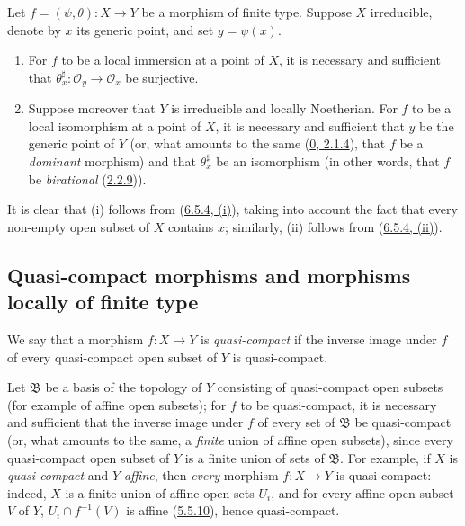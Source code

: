 \begin{corollary}[6.5.5]
\label{I.6.5.5}
Let $f=(\psi,\theta):X\to Y$ be a morphism of finite type. Suppose $X$
irreducible, denote by $x$ its generic point, and set $y=\psi(x)$.
\begin{enumerate}
  \item[(i)] For $f$ to be a local immersion at a point of $X$, it is
    necessary and sufficient that
    $\theta_x^\sharp:\mathscr{O}_y\to\mathscr{O}_x$ be surjective.
  \item[(ii)] Suppose moreover that $Y$ is irreducible and locally Noetherian.
    For $f$ to be a local isomorphism at a point of $X$, it is necessary and
    sufficient that $y$ be the generic point of $Y$ (or, what amounts to the
    same (\hyperref[0.2.1.4]{0, 2.1.4}), that $f$ be a
    \emph{dominant} morphism) and that $\theta_x^\sharp$ be an isomorphism (in
    other words, that $f$ be \emph{birational}
    (\hyperref[I.2.2.9]{2.2.9})).
\end{enumerate}
\end{corollary}

It is clear that (i) follows from
(\hyperref[I.6.5.4]{6.5.4, (i)}), taking into account the fact that every
non-empty open subset of $X$ contains $x$; similarly, (ii) follows from
(\hyperref[I.6.5.4]{6.5.4, (ii)}).

\subsection{Quasi-compact morphisms and morphisms locally of finite type}
\label{subsection:I.6.6}

\begin{definition}[6.6.1]
\label{I.6.6.1}
We say that a morphism $f:X\to Y$ is \emph{quasi-compact} if the inverse
image under $f$ of every quasi-compact open subset of $Y$ is quasi-compact.
\end{definition}

Let $\mathfrak{B}$ be a basis of the topology of $Y$ consisting of
quasi-compact open subsets (for example of affine open subsets); for $f$ to be
quasi-compact, it is necessary and sufficient that the inverse image under $f$
of every set of $\mathfrak{B}$ be quasi-compact (or, what amounts to the same,
a \emph{finite} union of affine open subsets), since every quasi-compact open
subset of $Y$ is a finite union of sets of $\mathfrak{B}$. For example, if $X$
is \emph{quasi-compact} and $Y$ \emph{affine}, then \emph{every} morphism
$f:X\to Y$ is quasi-compact: indeed, $X$ is a finite union of affine open
sets $U_i$, and for every affine open subset $V$ of $Y$,
$U_i\cap f^{-1}(V)$ is affine
(\hyperref[I.5.5.10]{5.5.10}), hence quasi-compact.

